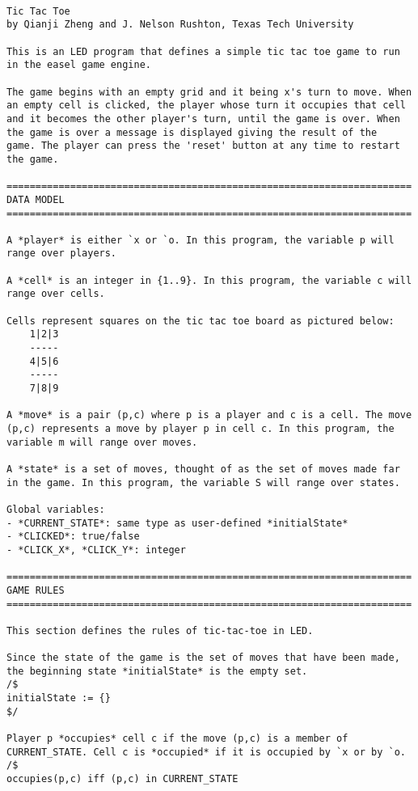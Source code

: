 \documentclass[letterpaper, 14pt]{extarticle}
\begin{document}
\begin{flushleft}

\begin{lstlisting}

Tic Tac Toe
by Qianji Zheng and J. Nelson Rushton, Texas Tech University

This is an LED program that defines a simple tic tac toe game to run in the easel game engine.

The game begins with an empty grid and it being x's turn to move. When an empty cell is clicked, the player whose turn it occupies that cell and it becomes the other player's turn, until the game is over. When the game is over a message is displayed giving the result of the  game. The player can press the 'reset' button at any time to restart the game.

======================================================================
DATA MODEL
======================================================================

A *player* is either `x or `o. In this program, the variable p will range over players.

A *cell* is an integer in {1..9}. In this program, the variable c will range over cells.

Cells represent squares on the tic tac toe board as pictured below:
    1|2|3
    -----
    4|5|6
    -----
    7|8|9

A *move* is a pair (p,c) where p is a player and c is a cell. The move (p,c) represents a move by player p in cell c. In this program, the variable m will range over moves.

A *state* is a set of moves, thought of as the set of moves made far in the game. In this program, the variable S will range over states.

Global variables:
- *CURRENT_STATE*: same type as user-defined *initialState*
- *CLICKED*: true/false
- *CLICK_X*, *CLICK_Y*: integer

======================================================================
GAME RULES
======================================================================

This section defines the rules of tic-tac-toe in LED.

Since the state of the game is the set of moves that have been made, the beginning state *initialState* is the empty set.
/$
initialState := {}
$/

Player p *occupies* cell c if the move (p,c) is a member of CURRENT_STATE. Cell c is *occupied* if it is occupied by `x or by `o.
/$
occupies(p,c) iff (p,c) in CURRENT_STATE


\end{lstlisting}
\end{flushleft}
\end{document}
